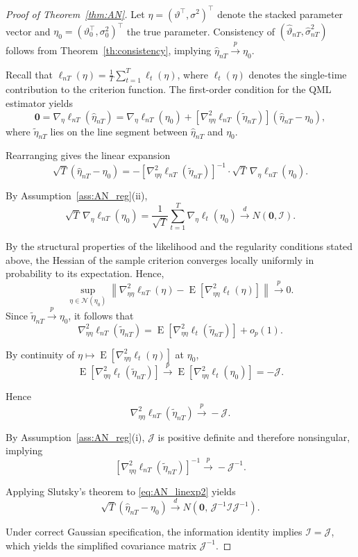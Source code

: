 \documentclass[10pt,a4paper]{amsart}
\DeclareMathOperator{\E}{E}
\newcommand{\xvec}{\boldsymbol}
\begin{document}
\begin{proof}[Proof of Theorem~\ref{thm:AN}]
Let $\eta=(\vartheta^\top,\sigma^2)^\top$ denote the stacked parameter
vector and $\eta_0=(\vartheta_0^\top,\sigma_0^2)^\top$ the true parameter.
Consistency of $(\hat\vartheta_{nT},\hat\sigma^2_{nT})$ follows from
Theorem~\ref{th:consistency}, implying $\hat\eta_{nT}\xrightarrow{p}\eta_0$.

Recall that $\ell_{nT}(\eta)=\frac{1}{T}\sum_{t=1}^T\ell_t(\eta)$,
where $\ell_t(\eta)$ denotes the single-time contribution to the
criterion function. The first-order condition for the QML estimator yields
\[
\xvec{0}
=
\nabla_\eta \ell_{nT}(\hat\eta_{nT})
=
\nabla_\eta \ell_{nT}(\eta_0)
+
\left[\nabla^2_{\eta\eta}\ell_{nT}(\tilde\eta_{nT})\right]
(\hat\eta_{nT}-\eta_0),
\]
where $\tilde\eta_{nT}$ lies on the line segment between
$\hat\eta_{nT}$ and $\eta_0$.

Rearranging gives the linear expansion
\begin{equation}\label{eq:AN_linexp2}
\sqrt{T}(\hat\eta_{nT}-\eta_0)
=
-\left[\nabla^2_{\eta\eta}\ell_{nT}(\tilde\eta_{nT})\right]^{-1}
\cdot
\sqrt{T}\,\nabla_\eta\ell_{nT}(\eta_0).
\end{equation}

By Assumption~\ref{ass:AN_reg}(ii),
\[
\sqrt{T}\,\nabla_\eta\ell_{nT}(\eta_0)
=
\frac{1}{\sqrt{T}}\sum_{t=1}^T\nabla_\eta\ell_t(\eta_0)
\xrightarrow{d}N(\xvec{0},\mathcal{I}).
\]

By the structural properties of the likelihood and the regularity
conditions stated above, the Hessian of the sample criterion converges
locally uniformly in probability to its expectation. Hence,
\[
\sup_{\eta\in\mathcal{N}(\eta_0)}
\left\|
\nabla^2_{\eta\eta}\ell_{nT}(\eta)
-
\E[\nabla^2_{\eta\eta}\ell_t(\eta)]
\right\|
\xrightarrow{p}0.
\]
Since $\tilde\eta_{nT}\xrightarrow{p}\eta_0$,
it follows that
\[
\nabla^2_{\eta\eta}\ell_{nT}(\tilde\eta_{nT})
=
\E[\nabla^2_{\eta\eta}\ell_t(\tilde\eta_{nT})]
+o_p(1).
\]

By continuity of
$\eta\mapsto\E[\nabla^2_{\eta\eta}\ell_t(\eta)]$ at $\eta_0$,
\[
\E[\nabla^2_{\eta\eta}\ell_t(\tilde\eta_{nT})]
\xrightarrow{p}
\E[\nabla^2_{\eta\eta}\ell_t(\eta_0)]
=
-\mathcal{J}.
\]

Hence
\[
\nabla^2_{\eta\eta}\ell_{nT}(\tilde\eta_{nT})
\xrightarrow{p}-\mathcal{J}.
\]

By Assumption~\ref{ass:AN_reg}(i),
$\mathcal{J}$ is positive definite and therefore nonsingular, implying
\[
\left[\nabla^2_{\eta\eta}\ell_{nT}(\tilde\eta_{nT})\right]^{-1}
\xrightarrow{p}
-\mathcal{J}^{-1}.
\]

Applying Slutsky's theorem to \eqref{eq:AN_linexp2} yields
\[
\sqrt{T}(\hat\eta_{nT}-\eta_0)
\xrightarrow{d}
N\!\left(\xvec{0},\,\mathcal{J}^{-1}\mathcal{I}\mathcal{J}^{-1}\right).
\]

Under correct Gaussian specification,
the information identity implies $\mathcal{I}=\mathcal{J}$,
which yields the simplified covariance matrix $\mathcal{J}^{-1}$.
\end{proof}
\end{document}
